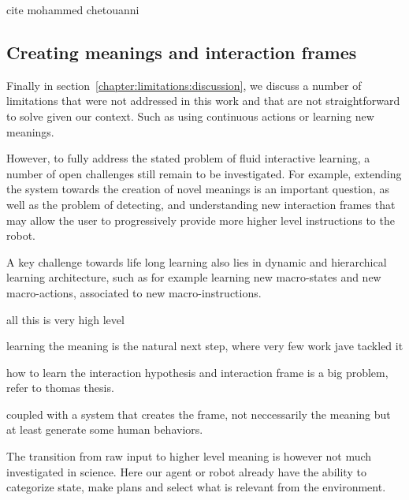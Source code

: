 cite mohammed chetouanni

\subsection{Creating meanings and interaction frames}


Finally in section~\ref{chapter:limitations:discussion}, we discuss a number of limitations that were not addressed in this work and that are not straightforward to solve given our context. Such as using continuous actions or learning new meanings.

However, to fully address the stated problem of fluid interactive learning, a number of open challenges still remain to be investigated. For example, extending the system towards the creation of novel meanings is an important question, as well as the problem of detecting, and understanding new interaction frames that may allow the user to progressively provide more higher level instructions to the robot. 

A key challenge towards life long learning also lies in dynamic and hierarchical learning architecture, such as for example learning new macro-states and new macro-actions, associated to new macro-instructions.

all this is very high level

learning the meaning is the natural next step, where very few work jave tackled it

how to learn the interaction hypothesis and interaction frame is a big problem, refer to thomas thesis.

coupled with a system that creates the frame, not neccessarily the meaning but at least generate some human behaviors.


The transition from raw input to higher level meaning is however not much investigated in science. Here our agent or robot already have the ability to categorize state, make plans and select what is relevant from the environment.

